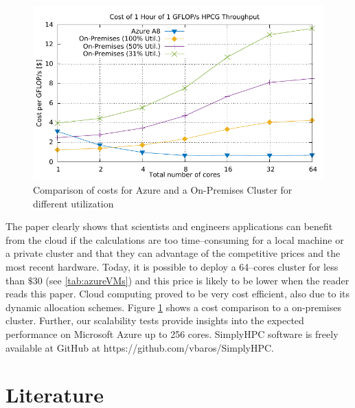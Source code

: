 \documentclass[3p,times]{elsarticle}
\begin{document}
\begin{figure}
	\centering
	\includegraphics[width=.5\linewidth]{gplt-cost}
	\caption{Comparison of costs for Azure and a On-Premises Cluster for different utilization}
	\label{fig:costs}
\end{figure}

The paper clearly shows that scientists and engineers applications can benefit from the cloud if the calculations are too time--consuming for a local machine or a private cluster and that they can advantage of the competitive prices and the most recent hardware. Today, it is possible to deploy a 64--cores cluster for less than $\$30$ (see \ref{tab:azureVMs}) and this price is likely to be lower when the reader reads this paper. Cloud computing proved to be very cost efficient, also due to its dynamic allocation schemes. Figure \ref{fig:costs} shows a cost comparison to a on-premises cluster. Further, our scalability tests provide insights into the expected performance on Microsoft Azure up to 256 cores. SimplyHPC software is freely available at GitHub at https://github.com/vbaros/SimplyHPC.

  


\section{Literature}
\label{sec:literature}



\end{document}
